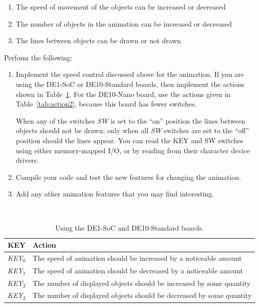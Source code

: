 \documentclass[epsfig,10pt,fullpage]{article}
\begin{document}
\begin{enumerate}
\item
The speed of movement of the objects can be increased or decreased
\item
The number of objects in the animation can be increased or decreased
\item
The lines between objects can be drawn or not drawn
\end{enumerate}

\noindent
Perform the following:

\begin{enumerate}

\item Implement the speed control discussed above for the animation. If you are using the 
DE1-SoC or DE10-Standard boards, then implement the actions shown in Table~\ref{tab:action1}.
For the DE10-Nano board, use the actions given in Table~\ref{tab:action2}, because this board
has fewer switches. 

When any of the switches {\it SW} is set to the ``on'' position the lines between objects should 
not be drawn; only when all {\it SW} switches are set to the ``off'' position should the 
lines appear. You can read the KEY and SW switches using either memory-mapped I/O, or 
by reading from their character device drivers.

\item Compile your code and test the new features for changing the animation.

\item Add any other animation features that you may find interesting.
\end{enumerate}

\begin{table}[h]
\caption{Using the DE1-SoC and DE10-Standard boards.}
~\\
\centering
\label{tab:action1}
\begin{tabular}{c|p{13cm}}
{\bf KEY} & {\bf Action} \\ \hline
\rule{0cm}{12pt}{\it KEY}$_0$ & The speed of animation should be increased by a noticeable amount\\
{\it KEY}$_1$ & The speed of animation should be decreased by a noticeable amount \\
{\it KEY}$_2$ & The number of displayed objects should be increased by some quantity \\
{\it KEY}$_3$ & The number of displayed objects should be decreased by some quantity \\
\end{tabular}
\end{table}
\end{document}
